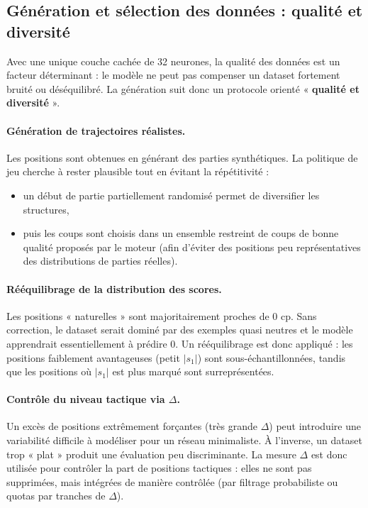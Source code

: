 \documentclass[11pt, a4paper]{article}
\begin{document}
\subsection{Génération et sélection des données : qualité et diversité}
Avec une unique couche cachée de 32 neurones, la qualité des données est un facteur déterminant : le modèle ne peut pas compenser un dataset fortement bruité ou déséquilibré. La génération suit donc un protocole orienté « \textbf{qualité et diversité} ».

\paragraph{Génération de trajectoires réalistes.}
Les positions sont obtenues en générant des parties synthétiques. La politique de jeu cherche à rester plausible tout en évitant la répétitivité :
\begin{itemize}
    \item un début de partie partiellement randomisé permet de diversifier les structures,
    \item puis les coups sont choisis dans un ensemble restreint de coups de bonne qualité proposés par le moteur (afin d'éviter des positions peu représentatives des distributions de parties réelles).
\end{itemize}

\paragraph{Rééquilibrage de la distribution des scores.}
Les positions « naturelles » sont majoritairement proches de $0$ cp. Sans correction, le dataset serait dominé par des exemples quasi neutres et le modèle apprendrait essentiellement à prédire $0$. Un rééquilibrage est donc appliqué : les positions faiblement avantageuses (petit $|s_1|$) sont sous-échantillonnées, tandis que les positions où $|s_1|$ est plus marqué sont surreprésentées.

\paragraph{Contrôle du niveau tactique via $\Delta$.}
Un excès de positions extrêmement forçantes (très grande $\Delta$) peut introduire une variabilité difficile à modéliser pour un réseau minimaliste. À l'inverse, un dataset trop « plat » produit une évaluation peu discriminante. La mesure $\Delta$ est donc utilisée pour contrôler la part de positions tactiques : elles ne sont pas supprimées, mais intégrées de manière contrôlée (par filtrage probabiliste ou quotas par tranches de $\Delta$).
\end{document}
